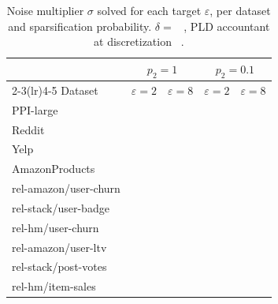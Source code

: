 \documentclass[11pt]{article}
\begin{document}
\begin{table}[H]
\centering\small
\caption{Noise multiplier $\sigma$ solved for each target $\varepsilon$, per
dataset and sparsification probability. $\delta = $ \ , PLD accountant at
discretization \ .}
\label{tab:sigma}
\begin{tabular}{lcccc}
\toprule
& \multicolumn{2}{c}{$p_2 = 1$} & \multicolumn{2}{c}{$p_2 = 0.1$}\\
\cmidrule(lr){2-3}\cmidrule(lr){4-5}
Dataset & $\varepsilon{=}2$ & $\varepsilon{=}8$ & $\varepsilon{=}2$ & $\varepsilon{=}8$\\
\midrule
PPI-large      & & & & \\
Reddit         & & & & \\
Yelp           & & & & \\
AmazonProducts & & & & \\
\midrule
rel-amazon/user-churn & & & & \\
rel-stack/user-badge  & & & & \\
rel-hm/user-churn     & & & & \\
\midrule
rel-amazon/user-ltv  & & & & \\
rel-stack/post-votes & & & & \\
rel-hm/item-sales    & & & & \\
\bottomrule
\end{tabular}
\end{table}
\end{document}

